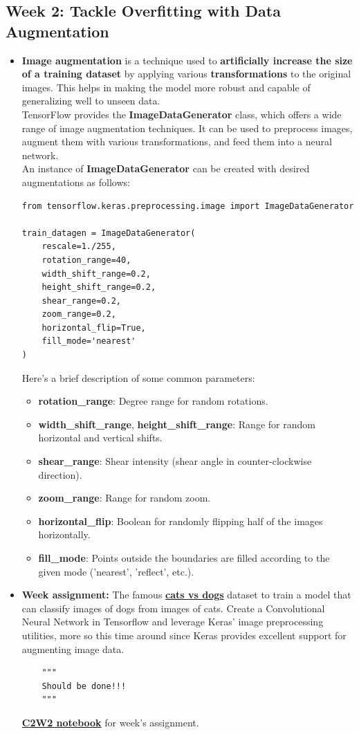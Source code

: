 \documentclass[20pt]{article}
\newcommand{\speciallink}[2]{\textbf{\textcolor{red}{\href{#1}{#2}}}}
\begin{document}
	\subsection{Week 2: Tackle Overfitting with Data Augmentation}
	\begin{itemize}
		\item \textbf{Image augmentation} is a technique used to \textbf{artificially increase the size of a training dataset} by applying various \textbf{transformations} to the original images. This helps in making the model more robust and capable of generalizing well to unseen data.\\
		TensorFlow provides the \textbf{ImageDataGenerator} class, which offers a wide range of image augmentation techniques. It can be used to preprocess images, augment them with various transformations, and feed them into a neural network.\\
		An instance of \textbf{ImageDataGenerator} can be created with desired augmentations as follows:
		\begin{verbatim}
from tensorflow.keras.preprocessing.image import ImageDataGenerator

train_datagen = ImageDataGenerator(
	rescale=1./255,
	rotation_range=40,
	width_shift_range=0.2,
	height_shift_range=0.2,
	shear_range=0.2,
	zoom_range=0.2,
	horizontal_flip=True,
	fill_mode='nearest'
)
		\end{verbatim}
		Here's a brief description of some common parameters:
		\begin{itemize}
			\item \textbf{rotation\_range}: Degree range for random rotations.
			\item \textbf{width\_shift\_range}, \textbf{height\_shift\_range}: Range for random horizontal and vertical shifts.
			\item \textbf{shear\_range}: Shear intensity (shear angle in counter-clockwise direction).
			\item \textbf{zoom\_range}: Range for random zoom.
			\item \textbf{horizontal\_flip}: Boolean for randomly flipping half of the images horizontally.
			\item \textbf{fill\_mode}: Points outside the boundaries are filled according to the given mode ('nearest', 'reflect', etc.).
		\end{itemize}
		\item \textbf{Week assignment:}
		The famous \underline{\textbf{cats vs dogs}} dataset to train a model that can classify images of dogs from images of cats. Create a Convolutional Neural Network in Tensorflow and leverage Keras' image preprocessing utilities, more so this time around since Keras provides excellent support for augmenting image data.
		\begin{verbatim}
	"""
	Should be done!!!
	"""
		\end{verbatim}
		\speciallink{https://drive.google.com/file/d/1JNBMLpp1g1mV0Si3-v9yWOUR6RE38esN/view?usp=drive_link}{C2W2 notebook} for week's assignment.
	\end{itemize}
\end{document}
